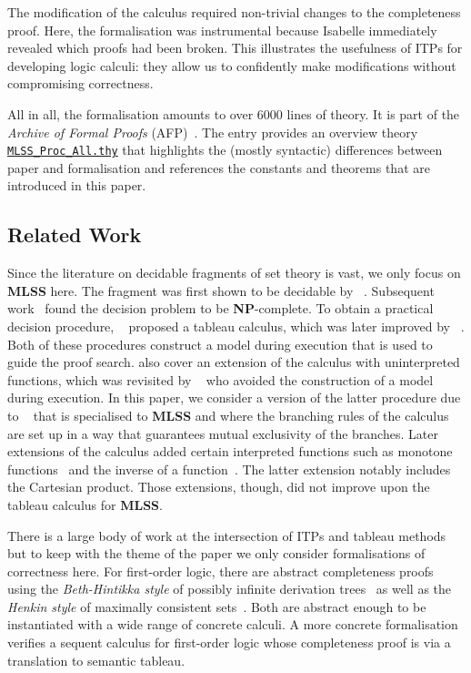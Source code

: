 \documentclass[runningheads]{llncs}
\newcommand{\MLSS}{\textbf{MLSS}}
\begin{document}
The modification of the calculus required non-trivial changes to the completeness proof.
Here, the formalisation was instrumental because Isabelle immediately revealed which proofs had been broken.
This illustrates the usefulness of ITPs for developing logic calculi: they allow us to confidently make modifications without compromising correctness. 

All in all, the formalisation amounts to over 6000 lines of theory.
It is part of the \emph{Archive of Formal Proofs} (AFP)~\cite{formalisation}.
The entry provides an overview theory \href{https://www.isa-afp.org/theories/mlss_decision_proc/#MLSS_Proc_All}{\texttt{MLSS\_Proc\_All.thy}} that highlights the (mostly syntactic) differences between paper and formalisation and references the constants and theorems that are introduced in this paper. 

\subsection{Related Work}
Since the literature on decidable fragments of set theory is vast, we only focus on \MLSS{} here.
The fragment was first shown to be decidable by \citeauthor{mlss_first}~\cite{mlss_first}.
Subsequent work~\cite{mlss_np} found the decision problem to be \textbf{NP}-complete.
To obtain a practical decision procedure, \citeauthor{mlss_first_tableau}~\cite{mlss_first_tableau} proposed a tableau calculus, which was later improved by \citeauthor{tableau_quantifier_free}~\cite{tableau_quantifier_free}.
Both of these procedures construct a model during execution that is used to guide the proof search.
\citeauthor{tableau_quantifier_free} also cover an extension of the calculus with uninterpreted functions, which was revisited by \citeauthor{mlss_quantification}~\cite{mlss_quantification} who avoided the construction of a model during execution.
In this paper, we consider a version of the latter procedure due to \citeauthor{new_fast_tableau}~\cite{new_fast_tableau} that is specialised to \MLSS{} and where the branching rules of the calculus are set up in a way that guarantees mutual exclusivity of the branches.
Later extensions of the calculus added certain interpreted functions such as monotone functions~\cite{mlss_monotone_functions} and the inverse of a function~\cite{mlss_cartesian_map}.
The latter extension notably includes the Cartesian product.
Those extensions, though, did not improve upon the tableau calculus for \MLSS{}.

There is a large body of work at the intersection of ITPs and tableau methods but to keep with the theme of the paper we only consider formalisations of correctness here.
For first-order logic, there are abstract completeness proofs using the \emph{Beth-Hintikka style} of possibly infinite derivation trees~\cite{completeness_coinductive} as well as the \emph{Henkin style} of maximally consistent sets~\cite{synthetic_completeness_afp}.
Both are abstract enough to be instantiated with a wide range of concrete calculi.
A more concrete formalisation~\cite{sequent_first_order} verifies a sequent calculus for first-order logic whose completeness proof is via a translation to semantic tableau.
\end{document}
